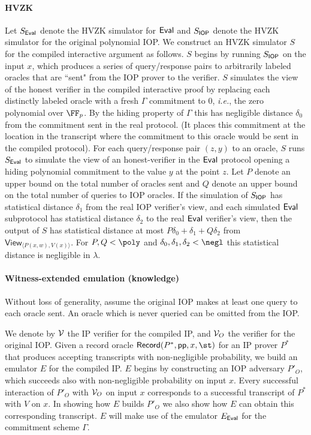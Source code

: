 \paragraph{HVZK} Let $S_\textsf{{Eval}}$ denote the HVZK simulator for $\textsf{{Eval}}$ and $S_{\textsf{{IOP}}}$ denote the HVZK simulator for the original polynomial IOP. We construct an HVZK simulator $S$ for the compiled interactive argument as follows. 
$S$ begins by running $S_{\textsf{{IOP}}}$ on the input $x$, which produces a series of query/response pairs to arbitrarily labeled oracles that are ``sent" from the IOP prover to the verifier. $S$ simulates the view of the honest verifier in the compiled interactive proof by replacing each distinctly labeled oracle with a fresh $\Gamma$ commitment to $0$, \emph{i.e.}, the zero polynomial over $\FF_p$. By the hiding property of $\Gamma$ this has negligible distance $\delta_0$ from the commitment sent in the real protocol.
(It places this commitment at the location in the transcript where the commitment to this oracle would be sent in the compiled protocol).
 For each query/response pair $(z, y)$ to an oracle, $S$ runs $S_\textsf{{Eval}}$ to simulate the view of an honest-verifier in the $\textsf{{Eval}}$ protocol opening a hiding polynomial commitment to the value $y$ at the point $z$. Let $P$ denote an upper bound on the total number of oracles sent and $Q$ denote an upper bound on the total number of queries to IOP oracles. 
If the simulation of $S_{\textsf{{IOP}}}$ has statistical distance $\delta_1$ from the real IOP verifier's view, and each simulated $\textsf{{Eval}}$ subprotocol has statistical distance $\delta_2$ to the real $\textsf{{Eval}}$ verifier's view, then the output of $S$ has statistical distance at most $P \delta_0 + \delta_1 + Q \delta_2$ from $\textsf{View}_{\langle P(x, w), V(x) \rangle}$. For $P, Q < \poly$ and $\delta_0, \delta_1, \delta_2 < \negl$ this statistical distance is negligible in $\lambda$. 

\paragraph{Witness-extended emulation (knowledge)}

Without loss of generality, assume the original IOP makes at least one query to each oracle sent. An oracle which is never queried can be omitted from the IOP.

We denote by $\mathcal{V}$ the IP verifier for the compiled IP, and $\mathcal{V}_{O}$ the verifier for the original IOP. 
Given a record oracle $\pro{Record}(P^*, \params, x, \st)$ for an IP prover $P^*$ that produces accepting transcripts with non-negligible probability, we build an emulator $E$ for the compiled IP. $E$ begins by constructing an IOP adversary $P'_{O}$, which succeeds also with non-negligible probability on input $x$. Every successful interaction of $P'_{O}$ with $\mathcal{V}_{O}$ on input $x$ corresponds to a successful transcript of $P^*$ with $V$ on $x$. In showing how $E$ builds $P'_{O}$ we also show how $E$ can obtain this corresponding transcript. $E$ will make use of the emulator $E_\textsf{{Eval}}$ for the commitment scheme $\Gamma$. %

